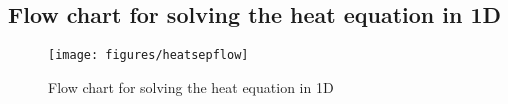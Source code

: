 \documentclass[12pt]{book}
\begin{document}
%


\newpage
\subsection{Flow chart for solving the heat equation in 1D}

\vspace{0.5in}
\begin{figure}[h]
  \centering
  \texttt{[image: figures/heatsepflow]}
  \caption{Flow chart for solving the heat equation in 1D}
  \label{fig:heatsepflow}
\end{figure}
\end{document}

